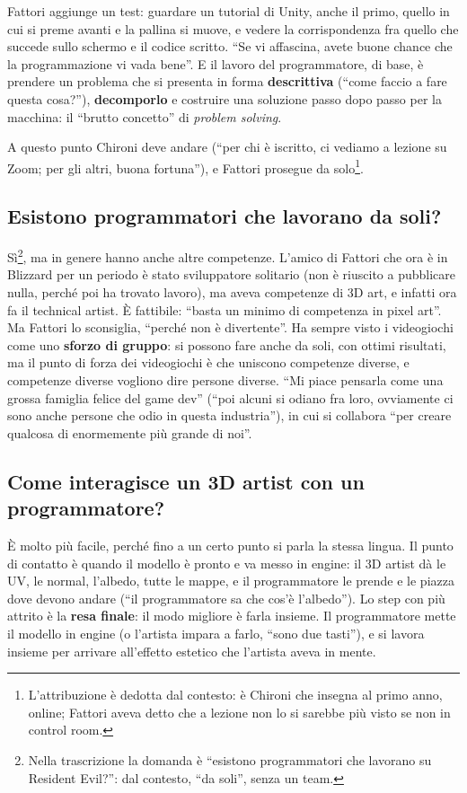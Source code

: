 Fattori aggiunge un test: guardare un tutorial di Unity, anche il primo, quello
in cui si preme avanti e la pallina si muove, e vedere la corrispondenza fra
quello che succede sullo schermo e il codice scritto. ``Se vi affascina,
avete buone chance che la programmazione vi vada bene''. E il lavoro del
programmatore, di base, è prendere un problema che si presenta in forma
\textbf{descrittiva} (``come faccio a fare questa cosa?''),
\textbf{decomporlo} e costruire una soluzione passo dopo passo per la
macchina: il ``brutto concetto'' di \emph{problem solving}.

A questo punto Chironi deve andare (``per chi è iscritto, ci vediamo a lezione
su Zoom; per gli altri, buona fortuna''), e Fattori prosegue da
solo\footnote{L'attribuzione è dedotta dal contesto: è Chironi che insegna al
primo anno, online; Fattori aveva detto che a lezione non lo si sarebbe più
visto se non in control room.}.

\subsection{Esistono programmatori che lavorano da soli?}

Sì\footnote{Nella trascrizione la domanda è ``esistono programmatori che
lavorano su Resident Evil?'': dal contesto, ``da soli'', senza un team.}, ma in
genere hanno anche altre competenze. L'amico di Fattori che ora è in Blizzard
per un periodo è stato sviluppatore solitario (non è riuscito a pubblicare
nulla, perché poi ha trovato lavoro), ma aveva competenze di 3D art, e infatti
ora fa il technical artist. È fattibile: ``basta un minimo di competenza in
pixel art''. Ma Fattori lo sconsiglia, ``perché non è divertente''. Ha sempre
visto i videogiochi come uno \textbf{sforzo di gruppo}: si possono fare anche
da soli, con ottimi risultati, ma il punto di forza dei videogiochi è che
uniscono competenze diverse, e competenze diverse vogliono dire persone
diverse. ``Mi piace pensarla come una grossa famiglia felice del game dev''
(``poi alcuni si odiano fra loro, ovviamente ci sono anche persone che odio in
questa industria''), in cui si collabora ``per creare qualcosa di enormemente
più grande di noi''.

\subsection{Come interagisce un 3D artist con un programmatore?}

È molto più facile, perché fino a un certo punto si parla la stessa lingua. Il
punto di contatto è quando il modello è pronto e va messo in engine: il 3D
artist dà le UV, le normal, l'albedo, tutte le mappe, e il programmatore le
prende e le piazza dove devono andare (``il programmatore sa che cos'è
l'albedo''). Lo step con più attrito è la \textbf{resa finale}: il modo
migliore è farla insieme. Il programmatore mette il modello in engine (o
l'artista impara a farlo, ``sono due tasti''), e si lavora insieme per arrivare
all'effetto estetico che l'artista aveva in mente.

